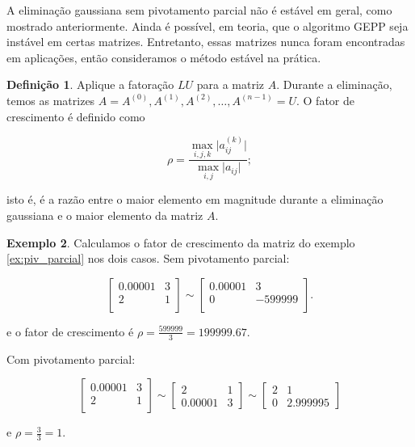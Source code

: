 \documentclass{article}
\theoremstyle{plain}
\theoremstyle{definition}
\newtheorem{defn}{Definição}[section]
\newtheorem{exmp}[defn]{Exemplo}
\theoremstyle{remark}
\begin{document}
A eliminação gaussiana sem pivotamento parcial não é estável em geral, como mostrado anteriormente. Ainda é possível, em teoria, que o algoritmo GEPP seja instável em certas matrizes. Entretanto, essas matrizes nunca foram encontradas em aplicações, então consideramos o método estável na prática.

\begin{defn}
  Aplique a fatoração \(LU\) para a matriz \(A\). Durante a eliminação, temos as matrizes \(A = A^{(0)}, A^{(1)}, A^{(2)}, \ldots, A^{(n-1)} = U\). O fator de crescimento é definido como

  \begin{equation}
    \rho = \frac{\max_{i, j, k}\vert a_{ij}^{(k)} \vert}{\max_{i, j}\vert a_{ij} \vert};
  \end{equation}

  \noindent isto é, é a razão entre o maior elemento em magnitude durante a eliminação gaussiana e o maior elemento da matriz \(A\).
\end{defn}

\begin{exmp}
  Calculamos o fator de crescimento da matriz do exemplo \ref{ex:piv_parcial} nos dois casos. Sem pivotamento parcial:

  \begin{equation*}
    \begin{bmatrix}
      0.00001 & 3 \\
      2 & 1 \\
    \end{bmatrix}
    \sim
    \begin{bmatrix}
      0.00001 & 3 \\
      0 & -599999 \\
    \end{bmatrix}.
  \end{equation*}

  \noindent e o fator de crescimento é \(\rho = \frac{599999}{3} = 199999.67\). 
  
  Com pivotamento parcial:

  \begin{equation*}
    \begin{bmatrix}
      0.00001 & 3 \\
      2 & 1 \\
    \end{bmatrix}
    \sim
    \begin{bmatrix}
      2 & 1 \\
      0.00001 & 3
    \end{bmatrix}
    \sim
    \begin{bmatrix}
      2 & 1 \\
      0 & 2.999995  
    \end{bmatrix}
  \end{equation*}

  \noindent e \(\rho = \frac{3}{3} = 1\).

\end{exmp}
\end{document}
